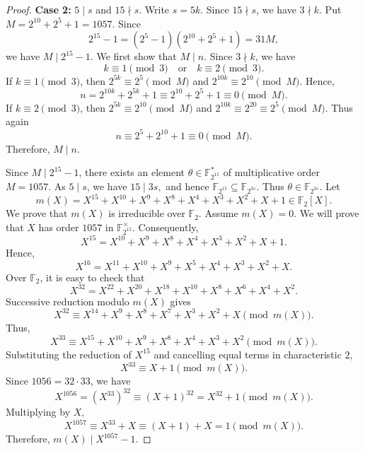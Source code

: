 \documentclass[12pt,draftcls,journal,onecolumn]{IEEEtran}
\begin{document}
\begin{proof}
\noindent
\textbf{Case 2:} $5\mid s$ and $15\nmid s$. Write
$
s=5k.
$
Since \(15\nmid s\), we have \(3\nmid k\). Put
$
M=2^{10}+2^5+1=1057.
$
Since
\[
2^{15}-1=(2^5-1)(2^{10}+2^5+1)=31M,
\]
we have
$
M\mid 2^{15}-1.
$
We first show that \(M\mid n\). Since \(3\nmid k\), we have
\[
k\equiv 1 \pmod 3
\quad\text{or}\quad
k\equiv 2 \pmod 3.
\]
If \(k\equiv 1\pmod 3\), then
$
2^{5k}\equiv 2^5\pmod M
$
and
$
2^{10k}\equiv 2^{10}\pmod M.
$
Hence,
\[
n=2^{10k}+2^{5k}+1
\equiv 2^{10}+2^5+1
\equiv 0\pmod M.
\]
If \(k\equiv 2\pmod 3\), then
$
2^{5k}\equiv 2^{10}\pmod M
$
and
$
2^{10k}\equiv 2^{20}\equiv 2^5\pmod M.
$
Thus again
\[
n\equiv 2^5+2^{10}+1\equiv 0\pmod M.
\]
Therefore,
$
M\mid n.
$

Since \(M\mid 2^{15}-1\), there exists an element
$
\theta\in \mathbb F_{2^{15}}^{*}
$
of multiplicative order \(M=1057\). As \(5\mid s\), we have
$
15\mid 3s,
$
and hence
$
\mathbb F_{2^{15}}\subseteq \mathbb F_{2^{3s}}.
$
Thus \(\theta\in\mathbb F_{2^{3s}}\).
Let
\[
m(X)
=
X^{15}+X^{10}+X^9+X^8+X^4+X^3+X^2+X+1
\in\mathbb F_2[X].
\]
We prove that \(m(X)\) is irreducible over \(\mathbb F_2\).
Assume \(m(X)=0\). We will prove that \(X\) has order \(1057\) in \(\mathbb F_{2^{15}}^\times\). Consequently,
\[
X^{15}=X^{10}+X^9+X^8+X^4+X^3+X^2+X+1.
\]
Hence,
\[
X^{16}=X^{11}+X^{10}+X^9+X^5+X^4+X^3+X^2+X.
\]
Over \(\mathbb F_2\), it is easy to check that
\[
X^{32}=X^{22}+X^{20}+X^{18}+X^{10}+X^8+X^6+X^4+X^2.
\]
Successive reduction modulo \(m(X)\) gives
\[
X^{32}\equiv X^{14}+X^9+X^8+X^7+X^3+X^2+X\pmod {m(X)}.
\]
Thus,
\[
X^{33}\equiv X^{15}+X^{10}+X^9+X^8+X^4+X^3+X^2\pmod {m(X)}.
\]
Substituting the reduction of \(X^{15}\) and cancelling equal terms in characteristic \(2\),
\[
X^{33}\equiv X+1 \pmod {m(X)}.
\]
Since \(1056=32\cdot 33\), we have
\[
X^{1056}=(X^{33})^{32}\equiv (X+1)^{32}=X^{32}+1\pmod {m(X)}.
\]
Multiplying by \(X\),
\[
X^{1057}\equiv X^{33}+X\equiv (X+1)+X=1\pmod {m(X)}.
\]
Therefore,
$
m(X)\mid X^{1057}-1.
$


\end{proof}
\end{document}
